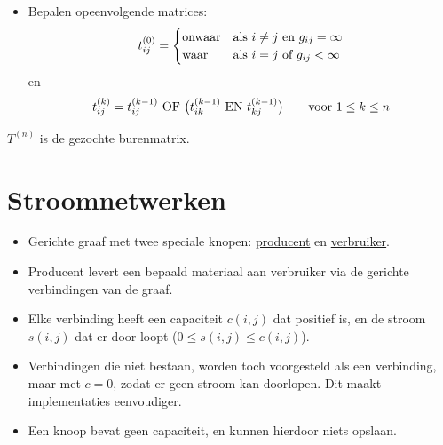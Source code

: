 \documentclass{report}
\begin{document}
\begin{itemize}
\begin{enumerate}
\begin{itemize}
					\item[\info] Bepalen opeenvolgende matrices:
					$$t_{ij}^{(0)} = 
					\begin{cases}
						\hbox{onwaar} & \hbox{als } i \neq j \hbox{ en } g_{ij} = \infty\\
						\hbox{waar}   & \hbox{als } i = j \hbox{ of } g_{ij} < \infty
					\end{cases}$$
					en
					$$
						t_{ij}^{(k)} = t_{ij}^{(k - 1)} \hbox{ OF } \big(t_{ik}^{(k - 1)} \hbox{ EN } t_{kj}^{(k - 1)}\big) \qquad \hbox{voor } 1 \leq k \leq n
					$$
				\end{itemize}
				$T^{(n)}$ is de gezochte burenmatrix.
	\end{enumerate}
\end{itemize}


\chapter{Stroomnetwerken}
\begin{itemize}
	\item Gerichte graaf met twee speciale knopen: \underline{producent} en \underline{verbruiker}.
	\item Producent levert een bepaald materiaal aan verbruiker via de gerichte verbindingen van de graaf.
	\item Elke verbinding heeft een capaciteit $c(i, j)$ dat positief is, en de stroom $s(i, j)$ dat er door loopt ($0 \leq s(i, j) \leq c(i, j)$). 
	\item Verbindingen die niet bestaan, worden toch voorgesteld als een verbinding, maar met $c = 0$, zodat er geen stroom kan doorlopen. Dit maakt implementaties eenvoudiger.
	\item Een knoop bevat geen capaciteit, en kunnen hierdoor niets opslaan.
\end{itemize}
\end{document}
